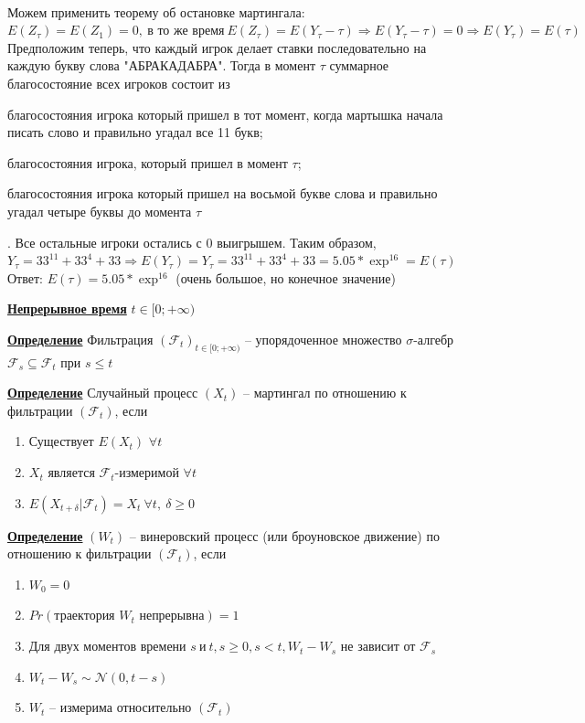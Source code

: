 \documentclass[a4paper]{article}
\begin{document}
\\ Можем применить теорему об остановке мартингала: $E({Z}_{\tau})=E({Z}_{1})=0, \ \text{в то же время} \ E({Z}_{\tau})=E({Y}_{\tau}-\tau) \Rightarrow E({Y}_{\tau}-\tau)=0 \Rightarrow E({Y}_{\tau})= E(\tau)$ \\
Предположим теперь, что каждый игрок делает ставки последовательно на каждую букву слова "АБРАКАДАБРА". Тогда в момент $\tau$ суммарное благосостояние всех игроков состоит из \begin{enumerate*}[font={\color{red!50!black}\bfseries}] \item благосостояния игрока который пришел в тот момент, когда мартышка начала писать слово и правильно угадал все 11 букв; \item благосостояния игрока, который пришел в момент  $\tau$; \item благосостояния игрока который пришел на восьмой букве слова и правильно угадал четыре буквы до момента $\tau$ \end{enumerate*}. Все остальные игроки остались с $0$ выигрышем. Таким образом, ${Y}_{\tau}=33^{11}+33^4+33 \Rightarrow E({Y}_{\tau})={Y}_{\tau}=33^{11}+33^4+33=5.05*{\exp}^{16} =E(\tau)$
\\ Ответ: $E(\tau)=5.05*{\exp}^{16}$ (очень большое, но конечное значение)
\\ \par {\bf\underline{Непрерывное время}} $t\in[0;+\infty)$
\par {\bf\underline{Определение}} Фильтрация $({\mathcal{F}_{t}})_{t\in[0;+\infty)}$ -- упорядоченное множество $\sigma$-алгебр $\mathcal{F}_{s} \subseteq \mathcal{F}_{t}$ при $s\leq t$
\par {\bf\underline{Определение}} Случайный процесс $({X}_t)$ -- мартингал по отношению к фильтрации $({\mathcal{F}_{t}})$, если \begin{enumerate}
 \item Существует $E({X}_{t})$ $\forall t$
 \item ${X}_t$ является ${\mathcal{F}_{t}}$-измеримой $\forall t$
 \item $E({X}_{t+\delta}|{\mathcal{F}_{t}})={X}_{t} \ \forall t, \ \delta \geq 0$
 \end{enumerate}
\par {\bf\underline{Определение}} $({W}_t)$ -- винеровский процесс (или броуновское движение) по отношению к фильтрации $({\mathcal{F}_{t}})$, если
 \begin{enumerate}
 \item  ${W}_0=0$
 \item  $Pr(\text{траектория ${W}_t$ непрерывна})=1$
 \item  Для двух моментов времени $s\ \text{и}\ t, s \geq 0, s<t, {W}_t-{W}_s$ не зависит от $\mathcal{F}_{s}$
 \item ${W}_t-{W}_s \sim \mathcal{N}(0,t-s)$
 \item ${W}_t$ -- измерима относительно $({\mathcal{F}_{t}})$
 \end{enumerate}
\end{document}
